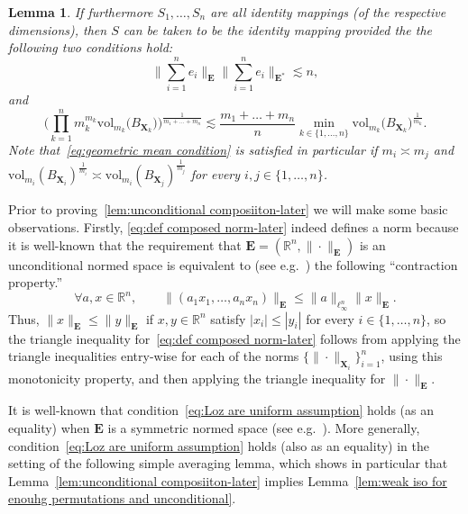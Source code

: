 \documentclass[11pt,reqno]{amsart}
\renewcommand{\le}{\leqslant}
\newcommand{\n}{\{1,\ldots,n\}}
\newcommand{\X}{\mathbf X}
\newcommand{\R}{\mathbb R}
\newtheorem{lemma}[theorem]{Lemma}
\theoremstyle{remark}
\newcommand{\vol}{\mathrm{vol}}
\renewcommand{\1}{\mathbf 1}
\newcommand{\bfE}{\mathbf{E}}
\begin{document}
\begin{lemma}
If furthermore  $S_1,\ldots, S_n$ are all identity mappings (of the respective dimensions), then $S$ can be taken to be the identity mapping provided the the following two conditions hold:
\begin{equation}\label{eq:Loz are uniform assumption}
\Big\|\sum_{i=1}^n e_i\Big\|_\bfE\Big\|\sum_{i=1}^n e_i\Big\|_{\bfE^{\textbf{*}}}\lesssim  n,
\end{equation}
and
\begin{equation}\label{eq:geometric mean condition}
\bigg(\prod_{k=1}^n m_k^{m_k}\vol_{m_k}\big(B_{\X_k}\big)\bigg)^{\frac{1}{m_1+\ldots+m_n}}\lesssim \frac{m_1+\ldots+m_n}{n}\min_{k\in \n} \vol_{m_k}\big(B_{\X_k}\big)^{\frac{1}{m_k}}.
\end{equation}
Note that~\eqref{eq:geometric mean condition} is satisfied in particular  if $m_i\asymp m_j$ and $\vol_{m_i}(B_{\X_i})^{\frac{1}{m_i}}\asymp \vol_{m_i}(B_{\X_j})^{\frac{1}{m_j}}$ for every $i,j\in \n$.
\end{lemma}


Prior to proving~\eqref{lem:unconditional composiiton-later}  we will make some  basic observations. Firstly, \eqref{eq:def composed norm-later} indeed defines a norm because it is well-known that the requirement that $\bfE=(\R^n,\|\cdot\|_\bfE)$ is an unconditional normed space is equivalent  to (see e.g.~\cite[Proposition~1.c.7]{LT77}) the following ``contraction property.''
\begin{equation}\label{eq:contraction unc}
\forall a,x\in \R^n,\qquad \|(a_1x_1,\ldots,a_nx_n)\|_\bfE\le \|a\|_{\ell_\infty^n} \|x\|_\bfE.
\end{equation}
Thus, $\|x\|_\bfE\le \|y\|_\bfE$ if $x,y\in \R^n$ satisfy $|x_i|\le |y_i|$ for every $i\in \n$, so the triangle inequality for~\eqref{eq:def composed norm-later} follows from applying the triangle inequalities entry-wise for each of the norms $\{\|\cdot\|_{\X_i}\}_{i=1}^n$, using this monotonicity property, and then applying the triangle inequality for $\|\cdot\|_{\bfE}$.

It is well-known that condition~\eqref{eq:Loz are uniform assumption} holds (as an equality) when $\bfE$ is a symmetric normed space (see e.g.~\cite[Proposition~3.a.6]{LT79}). More generally, condition~\eqref{eq:Loz are uniform assumption} holds (also as an equality)  in the setting of the following simple averaging lemma, which shows in particular that Lemma~\ref{lem:unconditional composiiton-later}  implies Lemma~\ref{lem:weak iso for enouhg permutations and unconditional}.
\end{document}
